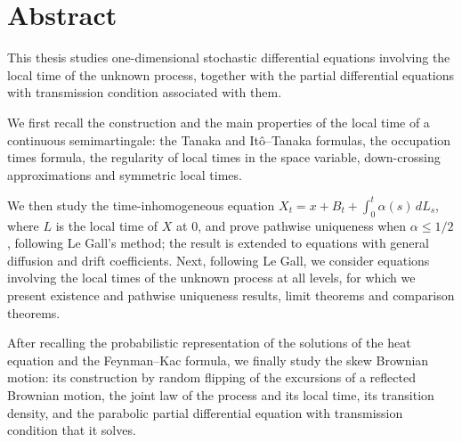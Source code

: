 \chapter*{Abstract}

This thesis studies one-dimensional stochastic differential equations
involving the local time of the unknown process, together with the partial
differential equations with transmission condition associated with them.

We first recall the construction and the main properties of the local time
of a continuous semimartingale: the Tanaka and It\^o--Tanaka formulas, the
occupation times formula, the regularity of local times in the space
variable, down-crossing approximations and symmetric local times.

We then study the time-inhomogeneous equation
$X_t = x + B_t + \int_0^t \alpha(s)\, dL_s$, where $L$ is the local time of
$X$ at $0$, and prove pathwise uniqueness when $\alpha \leqslant 1/2$,
following Le Gall's method; the result is extended to equations with general
diffusion and drift coefficients. Next, following Le Gall, we consider
equations involving the local times of the unknown process at all levels,
for which we present existence and pathwise uniqueness results, limit
theorems and comparison theorems.

After recalling the probabilistic representation of the solutions of the
heat equation and the Feynman--Kac formula, we finally study the skew
Brownian motion: its construction by random flipping of the excursions of a
reflected Brownian motion, the joint law of the process and its local time,
its transition density, and the parabolic partial differential equation
with transmission condition that it solves.
